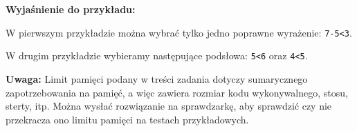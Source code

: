 \documentclass[zad,zawodnik,utf8]{sinol}
\begin{document}
\begin{tasktext}
\medskip
\noindent
\textbf{Wyjaśnienie do przykładu:}

W pierwszym przykładzie można wybrać tylko jedno poprawne wyrażenie: \texttt{7-5<3}.

W drugim przykładzie wybieramy następujące podsłowa: \texttt{5<6} oraz \texttt{4<5}.

\medskip
\noindent
\textbf{Uwaga:} Limit pamięci podany w treści zadania dotyczy sumarycznego zapotrzebowania na pamięć, a więc zawiera rozmiar kodu wykonywalnego, stosu, sterty, itp. Można wysłać rozwiązanie na sprawdzarkę, aby sprawdzić czy nie przekracza ono limitu pamięci na testach przykładowych.

\end{tasktext}
\end{document}

